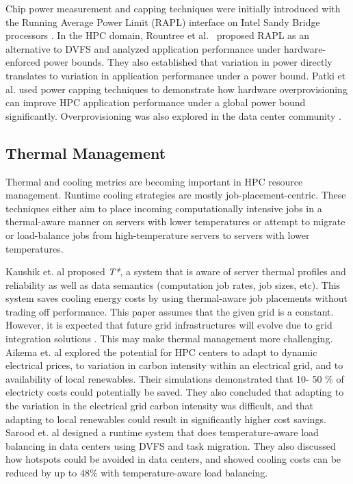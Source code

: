 Chip power measurement and capping techniques were initially introduced with the Running Average Power Limit (RAPL) interface on Intel Sandy Bridge processors \cite{IntelSDM,David2010}. In the HPC domain, Rountree et al.~\cite{Rountree2012} proposed RAPL as an alternative to DVFS and analyzed application performance under hardware-enforced power bounds. They also established that variation in power directly translates to variation in application performance under a power bound. Patki et al. \cite{Patki1} used power capping techniques to demonstrate how hardware overprovisioning can improve HPC application performance under a global power bound significantly. Overprovisioning was also explored in the data center community \cite{femal:04}.

\subsection{Thermal Management}
Thermal and cooling metrics are becoming important in HPC resource management. Runtime cooling strategies are mostly
job-placement-centric. These techniques either aim to place incoming computationally intensive jobs in a thermal-aware manner on servers with
lower temperatures or attempt to migrate or load-balance jobs from high-temperature servers to servers with lower temperatures.

Kaushik et. al \cite{kaushik_t*:_2012} proposed \emph{T*}, a system that is aware of server thermal profiles and reliability as well as data semantics (computation job rates, job sizes, etc). This system saves cooling energy costs by using thermal-aware job placements without trading off performance. This paper assumes that the given grid is a constant. However, it is expected that future grid infrastructures will evolve due to grid integration solutions \cite{he_architecture_2008}. This may make thermal management more challenging. Aikema et. al \cite{aikema_electrical_2011} explored the potential for HPC centers to adapt to dynamic electrical prices, to variation in carbon intensity within an electrical grid, and to availability of local renewables. Their simulations demonstrated that 10- 50 \% of electricty costs could potentially be saved. They also concluded that adapting to the variation in the electrical grid carbon intensity was difficult, and that adapting to local renewables could result in significantly higher cost savings. Sarood et. al \cite{SaroodSC11} designed a runtime system that does temperature-aware load balancing in data centers using DVFS and task migration. They also discussed how hotspots could be avoided in data centers, and showed cooling costs can be reduced by up to 48\% with temperature-aware load balancing.

